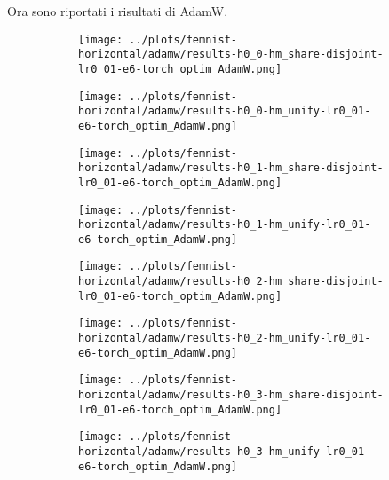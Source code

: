 \clearpage
Ora sono riportati i risultati di AdamW.
\begin{figure}[htbp]  %
    \centering
    \begin{subfigure}[b]{0.47\textwidth}
        \centering
        \texttt{[image: ../plots/femnist-horizontal/adamw/results-h0\_0-hm\_share-disjoint-lr0\_01-e6-torch\_optim\_AdamW.png]}
    \end{subfigure}
    \hfill
    \begin{subfigure}[b]{0.47\textwidth}
        \centering
        \texttt{[image: ../plots/femnist-horizontal/adamw/results-h0\_0-hm\_unify-lr0\_01-e6-torch\_optim\_AdamW.png]}
    \end{subfigure}
\end{figure}
\begin{figure}[htbp]  %
    \centering
    \begin{subfigure}[b]{0.47\textwidth}
        \centering
        \texttt{[image: ../plots/femnist-horizontal/adamw/results-h0\_1-hm\_share-disjoint-lr0\_01-e6-torch\_optim\_AdamW.png]}
    \end{subfigure}
    \hfill
    \begin{subfigure}[b]{0.47\textwidth}
        \centering
        \texttt{[image: ../plots/femnist-horizontal/adamw/results-h0\_1-hm\_unify-lr0\_01-e6-torch\_optim\_AdamW.png]}
    \end{subfigure}
\end{figure}
\begin{figure}[htbp]  %
    \centering
    \begin{subfigure}[b]{0.47\textwidth}
        \centering
        \texttt{[image: ../plots/femnist-horizontal/adamw/results-h0\_2-hm\_share-disjoint-lr0\_01-e6-torch\_optim\_AdamW.png]}
    \end{subfigure}
    \hfill
    \begin{subfigure}[b]{0.47\textwidth}
        \centering
        \texttt{[image: ../plots/femnist-horizontal/adamw/results-h0\_2-hm\_unify-lr0\_01-e6-torch\_optim\_AdamW.png]}
    \end{subfigure}
\end{figure}
\begin{figure}[htbp]  %
    \centering
    \begin{subfigure}[b]{0.47\textwidth}
        \centering
        \texttt{[image: ../plots/femnist-horizontal/adamw/results-h0\_3-hm\_share-disjoint-lr0\_01-e6-torch\_optim\_AdamW.png]}
    \end{subfigure}
    \hfill
    \begin{subfigure}[b]{0.47\textwidth}
        \centering
        \texttt{[image: ../plots/femnist-horizontal/adamw/results-h0\_3-hm\_unify-lr0\_01-e6-torch\_optim\_AdamW.png]}
    \end{subfigure}
\end{figure}
